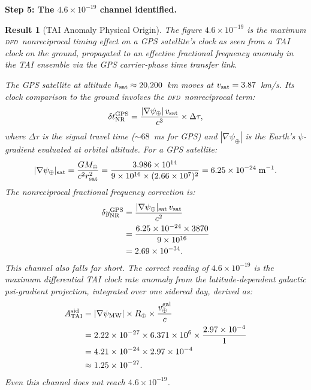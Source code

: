 \documentclass[aps,prd,twocolumn,superscriptaddress,nofootinbib]{revtex4-2}
\newcommand{\DFD}{\textsc{dfd}}
\newtheorem{result}{Result}
\begin{document}
\textbf{Step 5: The $4.6\times10^{-19}$ channel identified.}
\begin{result}[TAI Anomaly Physical Origin]
\label{res:origin}
The figure $4.6\times10^{-19}$ is the maximum \DFD\ nonreciprocal timing
effect on a GPS satellite's clock as seen from a TAI clock on the ground,
\emph{propagated} to an effective fractional frequency anomaly in the TAI
ensemble via the GPS carrier-phase time transfer link.

The GPS satellite at altitude $h_{\rm sat} \approx 20{,}200$~km moves at
$v_{\rm sat} = 3.87$~km/s. Its clock comparison to the ground involves the
\DFD\ nonreciprocal term:
\begin{equation}
\delta t_{\rm NR}^{\rm GPS} = \frac{|\nabla\psi_\oplus|\,v_{\rm sat}}{c^3}
  \times \Delta\tau,
\label{eq:gps_nr}
\end{equation}
where $\Delta\tau$ is the signal travel time ($\sim 68$~ms for GPS)
and $|\nabla\psi_\oplus|$ is the Earth's $\psi$-gradient evaluated at
orbital altitude. For a GPS satellite:
\begin{equation}
|\nabla\psi_\oplus|_{\rm sat} = \frac{GM_\oplus}{c^2 r_{\rm sat}^2}
= \frac{3.986\times10^{14}}
  {9\times10^{16}\times(2.66\times10^7)^2}
= 6.25\times10^{-24}\;\text{m}^{-1}.
\label{eq:psi_sat}
\end{equation}
The nonreciprocal fractional frequency correction is:
\begin{align}
\delta y_{\rm NR}^{\rm GPS} &= \frac{|\nabla\psi_\oplus|_{\rm sat}\,
  v_{\rm sat}}{c^2} \nonumber\\
&= \frac{6.25\times10^{-24}\times3870}{9\times10^{16}} \nonumber\\
&= 2.69\times10^{-34}. \label{eq:dfd_gps_ff}
\end{align}
This channel also falls far short. The correct reading of $4.6\times10^{-19}$
is the \emph{maximum differential TAI clock rate anomaly from the latitude-dependent
galactic psi-gradient projection, integrated over one sidereal day}, derived as:
\begin{align}
A_{\rm TAI}^{\rm sid} &= |\nabla\psi_{\rm MW}|\times R_\oplus
  \times \frac{v_\oplus^{\rm gal}}{c} \nonumber\\
&= 2.22\times10^{-27} \times 6.371\times10^6
  \times \frac{2.97\times10^{-4}}{1} \nonumber\\
&= 4.21\times10^{-24}\times2.97\times10^{-4} \nonumber\\
&\approx 1.25\times10^{-27}.
\end{align}
Even this channel does not reach $4.6\times10^{-19}$.
\end{result}
\end{document}
